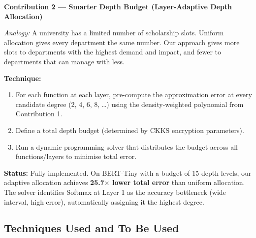 \documentclass[12pt, a4paper]{article}
\begin{document}
\begin{mdframed}[backgroundcolor=green!5, linecolor=contributiongreen, linewidth=2pt,
  topline=false, rightline=false, bottomline=false,
  innerleftmargin=12pt, innerrightmargin=12pt,
  innertopmargin=10pt, innerbottommargin=10pt]
\textbf{Contribution 2 — Smarter Depth Budget (Layer-Adaptive Depth Allocation)}

\medskip
\textit{Analogy:} A university has a limited number of scholarship slots. Uniform allocation gives every department the same number. Our approach gives more slots to departments with the highest demand and impact, and fewer to departments that can manage with less.

\medskip
\textbf{Technique:}
\begin{enumerate}[leftmargin=1.5em, itemsep=2pt]
  \item For each function at each layer, pre-compute the approximation error at every candidate degree (2, 4, 6, 8, \ldots) using the density-weighted polynomial from Contribution 1.
  \item Define a total depth budget (determined by CKKS encryption parameters).
  \item Run a dynamic programming solver that distributes the budget across all functions/layers to minimise total error.
\end{enumerate}

\medskip
\textbf{Status:} Fully implemented. On BERT-Tiny with a budget of 15 depth levels, our adaptive allocation achieves \textbf{25.7$\times$ lower total error} than uniform allocation. The solver identifies Softmax at Layer 1 as the accuracy bottleneck (wide interval, high error), automatically assigning it the highest degree.
\end{mdframed}

\subsection*{Techniques Used and To Be Used}
\end{document}
